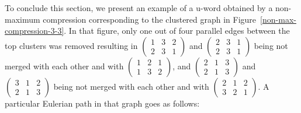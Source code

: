 \documentclass[12pt]{article}
\begin{document}
 
To conclude this section, we present an example of a u-word obtained by a non-maximum compression corresponding to the clustered graph in Figure~\ref{non-max-compression-3-3}. In that figure, only one out of four parallel edges between the top clusters was removed resulting in {\footnotesize $\left(\begin{array}{ccc} 1 & 3 & 2 \\ 2 & 3 & 1 \end{array}\right)$} and {\footnotesize $\left(\begin{array}{ccc} 2 & 3 & 1 \\ 2 & 3 & 1 \end{array}\right)$} being not merged with each other and with  {\footnotesize $\left(\begin{array}{ccc} 1 & 2 & 1 \\ 1 & 3 & 2 \end{array}\right)$}, and {\footnotesize $\left(\begin{array}{ccc} 2 & 1 & 3 \\ 2 & 1 & 3 \end{array}\right)$} and {\footnotesize $\left(\begin{array}{ccc} 3 & 1 & 2 \\ 2 & 1 & 3 \end{array}\right)$} being not merged with each other and with  {\footnotesize $\left(\begin{array}{ccc} 2 & 1 & 2 \\ 3 & 2 & 1 \end{array}\right)$}. A particular Eulerian path in that graph goes as follows:
\end{document}

